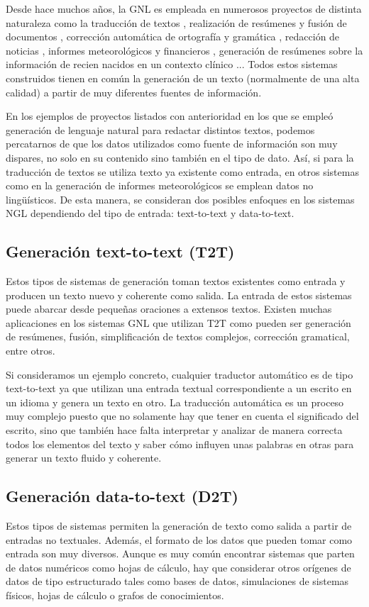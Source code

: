 Desde hace muchos años, la GNL es empleada en numerosos proyectos de distinta naturaleza como la traducción de textos \citep{Cho2014LearningPR}, realización de resúmenes y fusión de documentos \citep{clarke2010discourse}, corrección automática de ortografía y gramática \citep{islam2018bangla}, redacción de noticias \citep{leppanen2017data}, informes meteorológicos \citep{sripada2014case} y financieros \citep{ren2021hybrid}, generación de resúmenes sobre la información de recien nacidos en un contexto clínico \citep{BabyTalk}... Todos estos sistemas construidos tienen en común la generación de un texto (normalmente de una alta calidad) a partir de muy diferentes fuentes de información.

En los ejemplos de proyectos listados con anterioridad en los que se empleó generación de lenguaje natural para redactar distintos textos, podemos percatarnos de que los datos utilizados como fuente de información son muy dispares, no solo en su contenido sino también en el tipo de dato. Así, si para la traducción de textos se utiliza texto ya existente como entrada, en otros sistemas como en la generación de informes meteorológicos se emplean datos no lingüísticos. De esta manera, se consideran dos posibles enfoques en los sistemas NGL dependiendo del tipo de entrada: text-to-text y data-to-text.


\subsection{Generación text-to-text (T2T)}
Estos tipos de sistemas de generación toman textos existentes como entrada y producen un texto nuevo y coherente como salida. La entrada de estos sistemas puede abarcar desde pequeñas oraciones a extensos textos. Existen muchas aplicaciones en los sistemas GNL que utilizan T2T como pueden ser generación de resúmenes, fusión, simplificación de textos complejos, corrección gramatical, entre otros.

Si consideramos un ejemplo concreto, cualquier traductor automático es de tipo text-to-text ya que utilizan una entrada textual correspondiente a un escrito en un idioma y genera un texto en otro. La traducción automática es un proceso muy complejo puesto que no solamente hay que tener en cuenta el significado del escrito, sino que también hace falta interpretar y analizar de manera correcta todos los elementos del texto y saber cómo influyen unas palabras en otras para generar un texto fluido y coherente.

\subsection{Generación data-to-text (D2T)}\label{cap:nglD2T}
Estos tipos de sistemas permiten la generación de texto como salida a partir de entradas no textuales. Además, el formato de los datos que pueden tomar como entrada son muy diversos. Aunque es muy común encontrar sistemas que parten de datos numéricos como hojas de cálculo, hay que considerar otros orígenes de datos de tipo estructurado tales como bases de datos, simulaciones de sistemas físicos, hojas de cálculo o grafos de conocimientos. 

